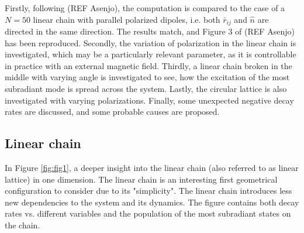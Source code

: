 \documentclass{article}
\begin{document}
Firstly, following (REF Asenjo), the computation is compared to the case of a $N=50$ linear chain with parallel polarized dipoles, i.e. both $\bar{r}_{ij}$ and $\hat{n}$ are directed in the same direction. The results match, and Figure 3 of (REF Asenjo) has been reproduced. Secondly, the variation of polarization in the linear chain is investigated, which may be a particularly relevant parameter, as it is controllable in practice with an external magnetic field. Thirdly, a linear chain broken in the middle with varying angle is investigated to see, how the excitation of the most subradiant mode is spread across the system. Lastly, the circular lattice is also investigated with varying polarizations. Finally, some unexpected negative decay rates are discussed, and some probable causes are proposed. 

\subsection{Linear chain}\label{disc:linear_chain}

In Figure \ref{fig:fig1}, a deeper insight into the linear chain (also referred to as linear lattice) in one dimension. The linear chain is an interesting first geometrical configuration to consider due to its "simplicity". The linear chain introduces less new dependencies to the system and its dynamics. The figure contains both decay rates vs. different variables and the population of the most subradiant states on the chain. 
\end{document}
